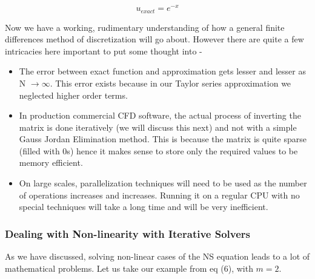 \documentclass[12pt]{article}
\begin{document}
\begin{equation*}
    u_{exact} = e^{-x}
\end{equation*}
\begin{center}
\end{center}
Now we have a working, rudimentary understanding of how a general finite differences method of discretization will go about. However there are quite a few intricacies here important to put some thought into -
\begin{itemize}
    \item The error between exact function and approximation gets lesser and lesser as N $\xrightarrow{}\infty$. This error exists because in our Taylor series approximation we neglected higher order terms.
    \item In production commercial CFD software, the actual process of inverting the matrix is done iteratively (we will discuss this next) and not with a simple Gauss Jordan Elimination method. This is because the matrix is quite sparse (filled with 0s) hence it makes sense to store only the required values to be memory efficient. 
    \item On large scales, parallelization techniques will need to be used as the number of operations increases and increases. Running it on a regular CPU with no special techniques will take a long time and will be very inefficient.

\end{itemize}

\subsubsection{Dealing with Non-linearity with Iterative Solvers}
As we have discussed, solving non-linear cases of the NS equation leads to a lot of mathematical problems. Let us take our example from eq (6), with $m = 2$.
\end{document}

